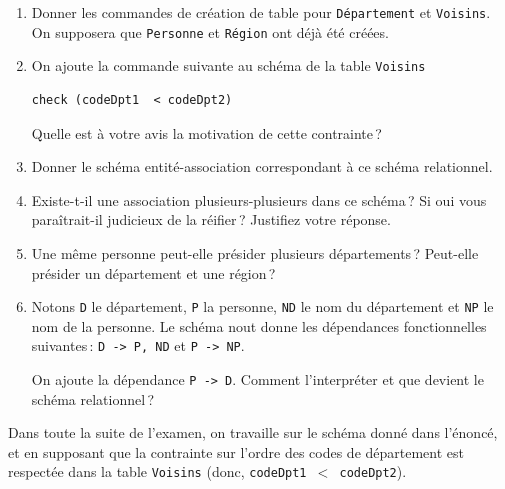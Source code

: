 \begin{enumerate}
 \item Donner les commandes de création de table pour \texttt{Département} et \texttt{Voisins}.
       On supposera que \texttt{Personne} et \texttt{Région} ont déjà été créées.
  \item On ajoute la commande suivante au schéma de la table \texttt{Voisins}
  
\begin{verbatim}
check (codeDpt1  < codeDpt2)
\end{verbatim}
  
   Quelle est à votre avis la motivation de cette contrainte\,?

  \item Donner le schéma entité-association 
        correspondant à ce schéma relationnel.
        
   \item Existe-t-il une association plusieurs-plusieurs dans ce schéma\,? Si oui 
     vous paraîtrait-il judicieux de la réifier\,? Justifiez votre réponse.

  \item Une même personne peut-elle présider plusieurs départements\,? 
   Peut-elle présider un département et une région\,?
   \item Notons \texttt{D} le département, \texttt{P} la personne, 
   \texttt{ND} le nom du département et \texttt{NP} le nom de la personne.
   Le schéma nout donne les dépendances fonctionnelles
   suivantes\,: \texttt{D -> P, ND} et \texttt{P -> NP}.
   
   On ajoute la dépendance \texttt{P -> D}. Comment l'interpréter
   et que devient le schéma relationnel\,?
   
\end{enumerate}

Dans toute la suite de l'examen, on travaille sur 
le schéma donné dans l'énoncé, et en supposant que la contrainte
sur l'ordre des codes de département est respectée dans la table \texttt{Voisins}
(donc,
\texttt{codeDpt1  $<$ codeDpt2}).

